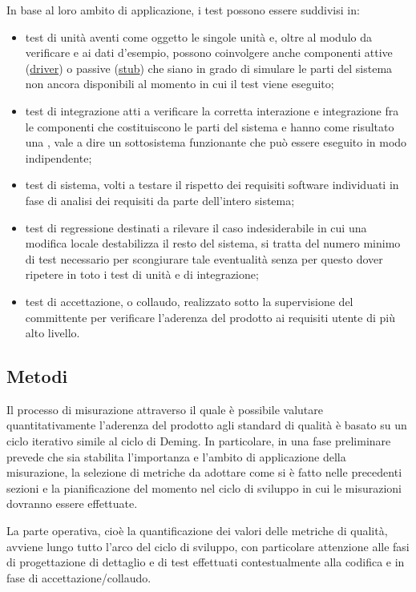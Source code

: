 In base al loro ambito di applicazione, i test possono essere suddivisi in:
\begin {itemize}
\item test di unità aventi come oggetto le singole unità e, oltre al modulo da verificare e ai dati d’esempio, possono coinvolgere anche componenti attive (\underline{driver}) o passive (\underline{stub}) che siano in grado di simulare le parti del sistema non ancora disponibili al momento in cui il test viene eseguito;

\item test di integrazione atti a verificare la corretta interazione e integrazione fra le componenti che costituiscono le parti del sistema e hanno come risultato una , vale a dire un sottosistema funzionante che può essere eseguito in modo indipendente;

\item test di sistema, volti a testare il rispetto dei requisiti software individuati in fase di analisi dei requisiti da parte dell’intero sistema;

\item test di regressione destinati a rilevare il caso indesiderabile in cui una modifica locale destabilizza il resto del sistema, si tratta del numero minimo di test necessario per scongiurare tale eventualità senza per questo dover ripetere in toto i test di unità e di integrazione;

\item test di accettazione, o collaudo, realizzato sotto la supervisione del committente per verificare l’aderenza del prodotto ai requisiti utente di più alto livello.

\end{itemize}

\subsection{Metodi}
Il processo di misurazione attraverso il quale è possibile valutare quantitativamente l'aderenza del prodotto agli standard di qualità è basato su un ciclo iterativo simile al ciclo di Deming. In particolare, in una fase preliminare prevede che sia stabilita l'importanza e l'ambito di applicazione della misurazione, la selezione di metriche da adottare come si è fatto nelle precedenti sezioni e la pianificazione del momento nel ciclo di sviluppo in cui le misurazioni dovranno essere effettuate.

La parte operativa, cioè la quantificazione dei valori delle metriche di qualità, avviene lungo tutto l'arco del ciclo di sviluppo, con particolare attenzione alle fasi di progettazione di dettaglio e di test effettuati contestualmente alla codifica e in fase di accettazione/collaudo.

